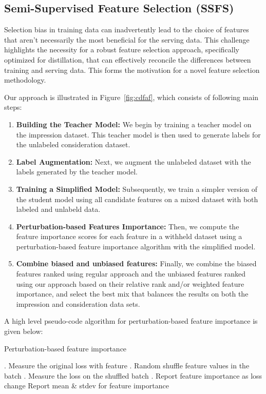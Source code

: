 \subsection{Semi-Supervised Feature Selection (SSFS)}
Selection bias in training data can inadvertently lead to the choice of features that aren't necessarily the most beneficial for the serving data. 
This challenge highlights the necessity for a robust feature selection approach, specifically optimized for distillation, that can effectively reconcile the differences between training and serving data. This forms the motivation for a novel feature selection methodology.

Our approach is illustrated in Figure~\ref{fig:cdfaf}, which consists of following main steps:
\newline
\begin{enumerate}
    \item \textbf{Building the Teacher Model:} We begin by training a teacher model on the impression dataset. This teacher model is then used to generate labels for the unlabeled consideration dataset.
    \item \textbf{Label Augmentation:} Next, we augment the unlabeled dataset with the labels generated by the teacher model.
    \item \textbf{Training a Simplified Model:} Subsequently, we train a simpler version of the student model using all candidate features on a mixed dataset with both labeled and unlabeld data. 
    \item \textbf{Perturbation-based Features Importance:} Then, we compute the feature importance scores for each feature in a withheld dataset using a perturbation-based feature importance algorithm with the simplified model.
    \item \textbf{Combine biased and unbiased features:} Finally, we combine the biased features ranked using regular approach and the unbiased features ranked using our approach based on their relative rank and/or weighted feature importance, and select the best mix that balances the results on both the impression and consideration data sets.
\end{enumerate}
\vspace{6pt}
A high level pseudo-code algorithm for perturbation-based feature importance is given below:

\begin{algorithm}[h]
\caption{Perturbation-based feature importance}\label{alg:fi}
\begin{algorithmic}
        . Measure the original loss with feature
        . Random shuffle feature values in the batch
        . Measure the loss on the shuffled batch
        . Report feature importance as loss change
    \EndFor
\EndFor
\State Report mean \& stdev for feature importance
\end{algorithmic}
\end{algorithm}


